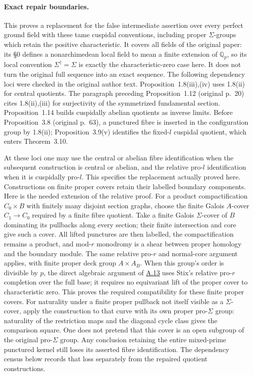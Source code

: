 \documentclass[11pt,a4paper]{article}
\newcommand{\statementref}[1]{\hyperlink{#1}{#1}}
\begin{document}
\paragraph{Exact repair boundaries.}
This proves a replacement for the false intermediate assertion over
every perfect ground field with these tame cuspidal conventions,
including proper $\Sigma$-groups which retain the positive
characteristic. It covers all fields of the original paper:
its \S0 defines a nonarchimedean local field to mean a finite
extension of $\mathbb Q_p$, so its local convention
$\Sigma^\dagger=\Sigma$ is exactly the characteristic-zero
case here. It does not turn the original
full sequence into an exact sequence. The following dependency loci were
checked in the original author text. Proposition~1.8(iii),(iv) uses
1.8(ii) for central quotients. The paragraph preceding Proposition~1.12
(original p.~20) cites 1.8(ii),(iii) for surjectivity of the symmetrized
fundamental section. Proposition~1.14 builds cuspidally abelian quotients
as inverse limits. Before Proposition~3.8 (original p.~63), a punctured
fibre is inserted in the configuration group by 1.8(ii); Proposition~3.9(v)
identifies the fixed-$l$ cuspidal quotient, which enters Theorem~3.10.

At these loci one may use the central or abelian fibre identification
when the subsequent construction is central or abelian, and the relative
pro-$l$ identification when it is cuspidally pro-$l$. This specifies the
replacement actually proved here. Constructions on finite proper covers
retain their labelled boundary components. Here is the needed extension
of the relative proof. For a product compactification $C_0\times B$
with finitely many disjoint section graphs, choose the finite Galois
$A$-cover $C_1\to C_0$ required by a finite fibre quotient. Take a
finite Galois $\Sigma$-cover of $B$ dominating its pullbacks along
every section; their finite intersection and core give such a cover.
All lifted punctures are then labelled, the compactification remains
a product, and mod-$r$ monodromy is a shear between proper homology
and the boundary module. The same relative pro-$r$ and normal-core
argument applies, with finite proper deck group $A\times A_B$.
When this group's order is divisible by $p$, the direct algebraic
argument of \statementref{A.13} uses Stix's relative pro-$r$
completion over the full base; it requires no equivariant lift of the
proper cover to characteristic zero.
This proves the required compatibility for these finite proper covers.
For naturality under a finite proper pullback not itself visible
as a $\Sigma$-cover, apply the construction to that curve with
its own proper pro-$\Sigma$ group: naturality of the restriction
maps and the diagonal cycle class gives the comparison square.
One does not pretend that this cover is an open subgroup of the
original pro-$\Sigma$ group. Any conclusion retaining the entire
mixed-prime punctured kernel still loses its asserted fibre
identification. The dependency census below records that loss
separately from the repaired quotient constructions.
\citep[Propositions~1.8,1.12,1.14,3.9 and Theorem~3.10]{LA_Mochizuki2007}
\end{document}

